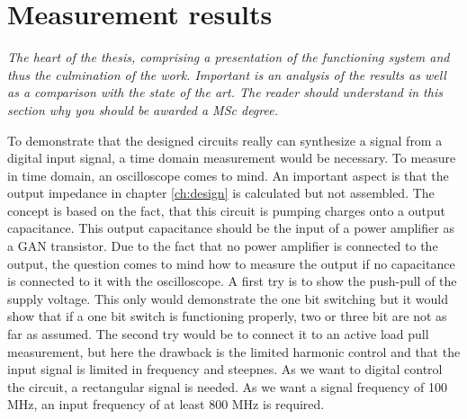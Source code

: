 \chapter{Measurement results}
\textit{The heart of the thesis, comprising a presentation of the functioning system and thus the culmination of the work. Important is an analysis of the results as well as a comparison with the state of the art. The reader should understand in this section why you should be awarded a MSc degree.}

To demonstrate that the designed circuits really can synthesize a signal from a digital input signal, a time domain measurement would be necessary.
To measure in time domain, an oscilloscope comes to mind.
An important aspect is that the output impedance in chapter \ref{ch:design} is calculated but not assembled. 
The concept is based on the fact, that this circuit is pumping charges onto a output capacitance.
This output capacitance should be the input of a power amplifier as a GAN transistor.
Due to the fact that no power amplifier is connected to the output, the question comes to mind how to measure the output if no capacitance is connected to it with the oscilloscope.
A first try is to show the push-pull of the supply voltage. 
This only would demonstrate the one bit switching but it would show that if a one bit switch is functioning properly, two or three bit are not as far as assumed.
The second try would be to connect it to an active load pull measurement, but here the drawback is the limited harmonic control and that the input signal is limited in frequency and steepnes. 
As we want to digital control the circuit, a rectangular signal is needed.
As we want a signal frequency of 100 MHz, an input frequency of at least 800 MHz is required.\\


